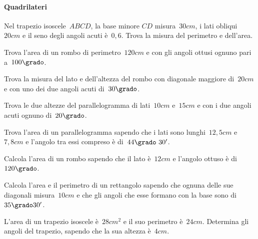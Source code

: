 \paragraph{Quadrilateri}
\begin{multicols}{2}
 \begin{esercizio}
\label{ese:G.26}
Nel trapezio isoscele~$ABCD$, la base minore $CD$ misura~$30\unit{cm}$, i lati obliqui~$20\unit{cm}$
e il seno degli angoli acuti è~$0,6$. Trova la misura del perimetro e dell'area.
\end{esercizio}

\begin{esercizio}
\label{ese:G.27}
Trova l'area di un rombo di perimetro~$120\unit{cm}$ e con gli angoli ottusi ognuno pari a~$100\grado$.
\end{esercizio}

\begin{esercizio}
\label{ese:G.28}
Trova la misura del lato e dell'altezza del rombo con diagonale maggiore di~$20\unit{cm}$ e con uno dei due angoli acuti di~$30\grado$.
\end{esercizio}

\begin{esercizio}
\label{ese:G.29}
Trova le due altezze del parallelogramma di lati~$10\unit{cm}$ e~$15\unit{cm}$ e con i due angoli acuti ognuno di~$20\grado$.
\end{esercizio}

\begin{esercizio}
\label{ese:G.30}
Trova l'area di un parallelogramma sapendo che i lati sono lunghi~$12,5\unit{cm}$ e~$7,8\unit{cm}$ e l'angolo tra essi compreso è di~$44\grado~30'$.
\end{esercizio}

\begin{esercizio}
\label{ese:G.31}
Calcola l'area di un rombo sapendo che il lato è~$12\unit{cm}$ e l'angolo ottuso è di~$120\grado$.
\end{esercizio}

\begin{esercizio}
\label{ese:G.32}
Calcola l'area e il perimetro di un rettangolo sapendo che ognuna delle sue diagonali misura~$10\unit{cm}$
e che gli angoli che esse formano con la base sono di~$35\grado30'$.
\end{esercizio}

\begin{esercizio}
\label{ese:G.33}
L'area di un trapezio isoscele è~$28\unit{cm^2}$ e il suo perimetro è~$24\unit{cm}$. Determina gli angoli del trapezio,
sapendo che la sua altezza è~$4\unit{cm}$.
\end{esercizio}
\end{multicols}

